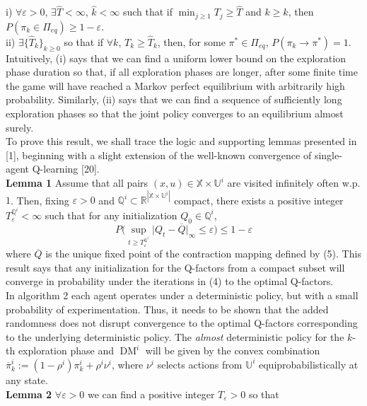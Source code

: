 \documentclass[10pt]{article}
\newcommand{\mbb}[1]{\mathbb{#1}}
\newcommand{\1}[1]{\mathbbm{1}_{#1}}
\DeclareMathOperator{\DM}{DM}
\begin{document}
i) $\forall\varepsilon>0$, $\exists \hat{T}<\infty$, $\hat{k}<\infty$ such that if $\min_{j\geq 1}T_j\geq\hat{T}$ and $k\geq\hat{k}$, then $P(\pi_k\in\Pi_{eq})\geq 1-\varepsilon$.\\[5pt]
ii) $\exists\{\hat{T}_k\}_{k\geq 0}$ so that if $\forall k$, $T_k\geq\hat{T}_k$, then, for some $\pi^\ast\in\Pi_{eq}$, $P(\pi_k\rightarrow\pi^\ast)=1$.\\[5pt]
Intuitively, (i) says that we can find a uniform lower bound on the exploration phase duration so that, if all exploration phases are longer, after some finite time the game will have reached a Markov perfect equilibrium with arbitrarily high probability. Similarly, (ii) says that we can find a sequence of sufficiently long exploration phases so that
the joint policy converges to an equilibrium almost surely.\\[5pt]
To prove this result, we shall trace the logic and supporting lemmas presented in [1], beginning with a slight extension of the well-known convergence of single-agent Q-learning [20].\\[5pt]
{\bf Lemma 1}\hspace{5pt} Assume that all pairs $(x,u)\in\mbb{X}\times\mbb{U}^i$ are visited infinitely often w.p. $1$. Then, fixing $\varepsilon>0$ and $\mbb{Q}^i\subset\mbb{R}^{|\mbb{X}\times\mbb{U}^i|}$ compact, there exists a positive integer $T_\varepsilon^{\mbb{Q}^i}<\infty$ such that
for any initialization $Q_0\in\mbb{Q}^i$, 
\[P\big(\sup_{t\geq T^{\mbb{Q}^i}_\varepsilon}\big|Q_t-\overline{Q}\big|_{\infty}\leq \varepsilon\big)\leq 1-\varepsilon\tag{9}\]
where $\overline{Q}$ is the unique fixed point of the contraction mapping defined by (5). This result says that any initialization for the Q-factors from a compact subset will converge in probability under the iterations in (4) to the optimal Q-factors. \\[5pt]
In algorithm 2 each agent operates under a deterministic policy, but with a small probability of experimentation. Thus, it needs to be shown that the added randomness does not disrupt convergence to the optimal Q-factors corresponding to the underlying deterministic policy. The {\it almost} deterministic policy for the $k$-th exploration phase and $\DM^i$ will be given by the convex combination $\overline{\pi}^i_k:=(1-\rho^i)\pi^i_k+\rho^i\nu^i$, where $\nu^i$ selects actions from $\mbb{U}^i$ equiprobabilistically at any state.\\[5pt]
{\bf Lemma 2}\hspace{5pt} $\forall\varepsilon>0$ we can find a positive integer $T_\varepsilon>0$ so that 
\end{document}
